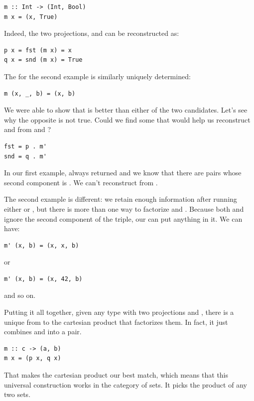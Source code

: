 \begin{Verbatim}
m :: Int -> (Int, Bool)
m x = (x, True)
\end{Verbatim}
Indeed, the two projections,  and  can be
reconstructed as:

\begin{Verbatim}
p x = fst (m x) = x
q x = snd (m x) = True
\end{Verbatim}
The  for the second example is similarly uniquely determined:

\begin{Verbatim}
m (x, _, b) = (x, b)
\end{Verbatim}
We were able to show that  is better than either of
the two candidates. Let's see why the opposite is not true. Could we
find some  that would help us reconstruct 
and  from  and ?

\begin{Verbatim}
fst = p . m'
snd = q . m'
\end{Verbatim}
In our first example,  always returned  and we
know that there are pairs whose second component is . We
can't reconstruct  from .

The second example is different: we retain enough information after
running either  or , but there is more than one way
to factorize  and . Because both  and
 ignore the second component of the triple, our 
can put anything in it. We can have:

\begin{Verbatim}
m' (x, b) = (x, x, b)
\end{Verbatim}
or

\begin{Verbatim}
m' (x, b) = (x, 42, b)
\end{Verbatim}
and so on.

Putting it all together, given any type  with two projections
 and , there is a unique  from 
to the cartesian product  that factorizes them. In fact,
it just combines  and  into a pair.

\begin{Verbatim}
m :: c -> (a, b)
m x = (p x, q x)
\end{Verbatim}
That makes the cartesian product  our best match, which
means that this universal construction works in the category of sets. It
picks the product of any two sets.

